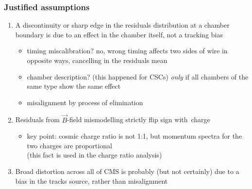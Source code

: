 \documentclass[compress]{beamer}
\begin{document}

\begin{frame}
\frametitle{Justified assumptions}
\begin{enumerate}\setlength{\itemsep}{0.5 cm}
\item A discontinuity or sharp edge in the residuals distribution at a chamber
  boundary is due to an effect in the chamber itself, not a tracking bias
\begin{itemize}\setlength{\itemsep}{0.1 cm}
\item timing miscalibration? no, wrong timing affects two sides of
  wire in opposite ways, cancelling in the residuals mean
\item chamber description?  (this happened for CSCs) {\it only} if all
  chambers of the same type show the same effect
\item misalignment by process of elimination
\end{itemize}

\item Residuals from $\vec{B}$-field mismodelling strictly flip sign
  \mbox{with charge\hspace{-0.5 cm}}
\begin{itemize}
\item key point: cosmic charge ratio is not 1:1, but momentum spectra
  for the two charges are proportional \\ (this fact is used in the charge ratio analysis)
\end{itemize}

\item Broad distortion across all of CMS is probably (but not
  certainly) due to a bias in the tracks source, rather than misalignment
\end{enumerate}
\end{frame}
\end{document}
